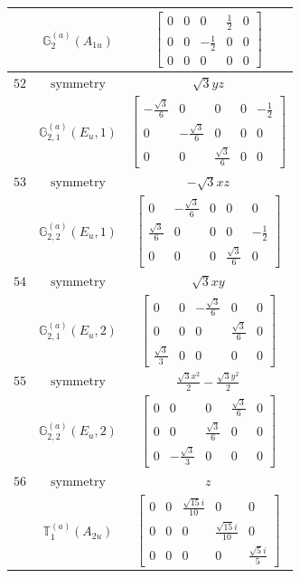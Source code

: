 \documentclass[fleqn,8pt,landscape]{jsarticle}
\begin{document}
\begin{longtable}{ccc}
$  $ & $ \mathbb{G}_{2}^{(a)}(A_{1u}) $ & $ \begin{bmatrix} 0 & 0 & 0 & \frac{1}{2} & 0 \\ 0 & 0 & - \frac{1}{2} & 0 & 0 \\ 0 & 0 & 0 & 0 & 0 \end{bmatrix} $ \\ \hline
$ 52 $ & $ \text{symmetry} $ & $ \sqrt{3} y z $ \\
$  $ & $ \mathbb{G}_{2,1}^{(a)}(E_{u},1) $ & $ \begin{bmatrix} - \frac{\sqrt{3}}{6} & 0 & 0 & 0 & - \frac{1}{2} \\ 0 & - \frac{\sqrt{3}}{6} & 0 & 0 & 0 \\ 0 & 0 & \frac{\sqrt{3}}{6} & 0 & 0 \end{bmatrix} $ \\ \hline
$ 53 $ & $ \text{symmetry} $ & $ - \sqrt{3} x z $ \\
$  $ & $ \mathbb{G}_{2,2}^{(a)}(E_{u},1) $ & $ \begin{bmatrix} 0 & - \frac{\sqrt{3}}{6} & 0 & 0 & 0 \\ \frac{\sqrt{3}}{6} & 0 & 0 & 0 & - \frac{1}{2} \\ 0 & 0 & 0 & \frac{\sqrt{3}}{6} & 0 \end{bmatrix} $ \\ \hline
$ 54 $ & $ \text{symmetry} $ & $ \sqrt{3} x y $ \\
$  $ & $ \mathbb{G}_{2,1}^{(a)}(E_{u},2) $ & $ \begin{bmatrix} 0 & 0 & - \frac{\sqrt{3}}{6} & 0 & 0 \\ 0 & 0 & 0 & \frac{\sqrt{3}}{6} & 0 \\ \frac{\sqrt{3}}{3} & 0 & 0 & 0 & 0 \end{bmatrix} $ \\ \hline
$ 55 $ & $ \text{symmetry} $ & $ \frac{\sqrt{3} x^{2}}{2} - \frac{\sqrt{3} y^{2}}{2} $ \\
$  $ & $ \mathbb{G}_{2,2}^{(a)}(E_{u},2) $ & $ \begin{bmatrix} 0 & 0 & 0 & \frac{\sqrt{3}}{6} & 0 \\ 0 & 0 & \frac{\sqrt{3}}{6} & 0 & 0 \\ 0 & - \frac{\sqrt{3}}{3} & 0 & 0 & 0 \end{bmatrix} $ \\ \hline
$ 56 $ & $ \text{symmetry} $ & $ z $ \\
$  $ & $ \mathbb{T}_{1}^{(a)}(A_{2u}) $ & $ \begin{bmatrix} 0 & 0 & \frac{\sqrt{15} i}{10} & 0 & 0 \\ 0 & 0 & 0 & \frac{\sqrt{15} i}{10} & 0 \\ 0 & 0 & 0 & 0 & \frac{\sqrt{5} i}{5} \end{bmatrix} $ \\ \hline

\end{longtable}
\end{document}
